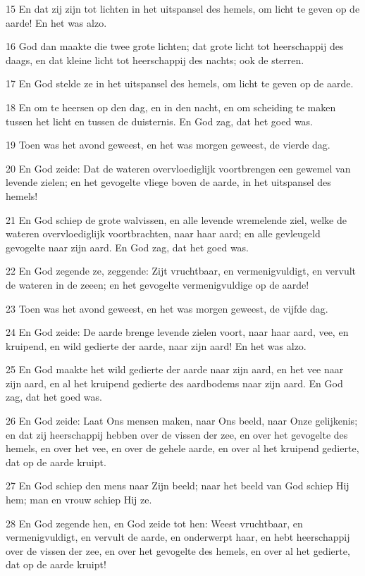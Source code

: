 \par 15 En dat zij zijn tot lichten in het uitspansel des hemels, om licht te geven op de aarde! En het was alzo.
\par 16 God dan maakte die twee grote lichten; dat grote licht tot heerschappij des daags, en dat kleine licht tot heerschappij des nachts; ook de sterren.
\par 17 En God stelde ze in het uitspansel des hemels, om licht te geven op de aarde.
\par 18 En om te heersen op den dag, en in den nacht, en om scheiding te maken tussen het licht en tussen de duisternis. En God zag, dat het goed was.
\par 19 Toen was het avond geweest, en het was morgen geweest, de vierde dag.
\par 20 En God zeide: Dat de wateren overvloediglijk voortbrengen een gewemel van levende zielen; en het gevogelte vliege boven de aarde, in het uitspansel des hemels!
\par 21 En God schiep de grote walvissen, en alle levende wremelende ziel, welke de wateren overvloediglijk voortbrachten, naar haar aard; en alle gevleugeld gevogelte naar zijn aard. En God zag, dat het goed was.
\par 22 En God zegende ze, zeggende: Zijt vruchtbaar, en vermenigvuldigt, en vervult de wateren in de zeeen; en het gevogelte vermenigvuldige op de aarde!
\par 23 Toen was het avond geweest, en het was morgen geweest, de vijfde dag.
\par 24 En God zeide: De aarde brenge levende zielen voort, naar haar aard, vee, en kruipend, en wild gedierte der aarde, naar zijn aard! En het was alzo.
\par 25 En God maakte het wild gedierte der aarde naar zijn aard, en het vee naar zijn aard, en al het kruipend gedierte des aardbodems naar zijn aard. En God zag, dat het goed was.
\par 26 En God zeide: Laat Ons mensen maken, naar Ons beeld, naar Onze gelijkenis; en dat zij heerschappij hebben over de vissen der zee, en over het gevogelte des hemels, en over het vee, en over de gehele aarde, en over al het kruipend gedierte, dat op de aarde kruipt.
\par 27 En God schiep den mens naar Zijn beeld; naar het beeld van God schiep Hij hem; man en vrouw schiep Hij ze.
\par 28 En God zegende hen, en God zeide tot hen: Weest vruchtbaar, en vermenigvuldigt, en vervult de aarde, en onderwerpt haar, en hebt heerschappij over de vissen der zee, en over het gevogelte des hemels, en over al het gedierte, dat op de aarde kruipt!
